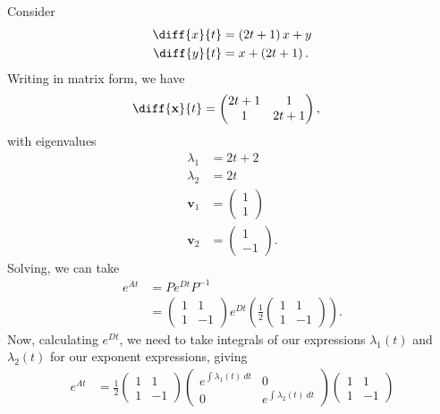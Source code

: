 \documentclass[10pt]{mypackage}
\begin{document}
\begin{example}
  Consider
  \begin{align*}
    \diff{x}{t} &= \left( 2t + 1 \right)x + y\\
    \diff{y}{t} &= x + \left( 2t + 1 \right).
  \end{align*}
  Writing in matrix form, we have
  \begin{align*}
    \diff{\mathbf{x}}{t} &= \begin{pmatrix}2t + 1 & 1 \\ 1 & 2t + 1\end{pmatrix},
  \end{align*}
  with eigenvalues
  \begin{align*}
    \lambda_1 &= 2t+2\\
    \lambda_2 &= 2t\\
    \mathbf{v}_1 &= \begin{pmatrix}1\\1\end{pmatrix}\\
    \mathbf{v}_2 &= \begin{pmatrix}1\\-1\end{pmatrix}.
  \end{align*}
  Solving, we can take
  \begin{align*}
    e^{At} &= Pe^{Dt}P^{-1}\\
           &= \begin{pmatrix}1 & 1 \\ 1 & -1\end{pmatrix} e^{Dt} \left( \frac{1}{2} \begin{pmatrix}1 & 1 \\ 1 & -1\end{pmatrix} \right).
  \end{align*}
  Now, calculating $e^{Dt}$, we need to take integrals of our expressions $\lambda_1(t)$ and $\lambda_2(t)$ for our exponent expressions, giving
  \begin{align*}
    e^{At} &= \frac{1}{2} \begin{pmatrix}1 & 1 \\ 1 & -1\end{pmatrix} \begin{pmatrix}e^{\int_{}^{} \lambda_1(t)\:dt} & 0 \\ 0 & e^{\int_{}^{} \lambda_2(t)\:dt}\end{pmatrix} \begin{pmatrix}1 & 1 \\ 1 & -1\end{pmatrix}\\

\end{align*}
\end{example}
\end{document}
